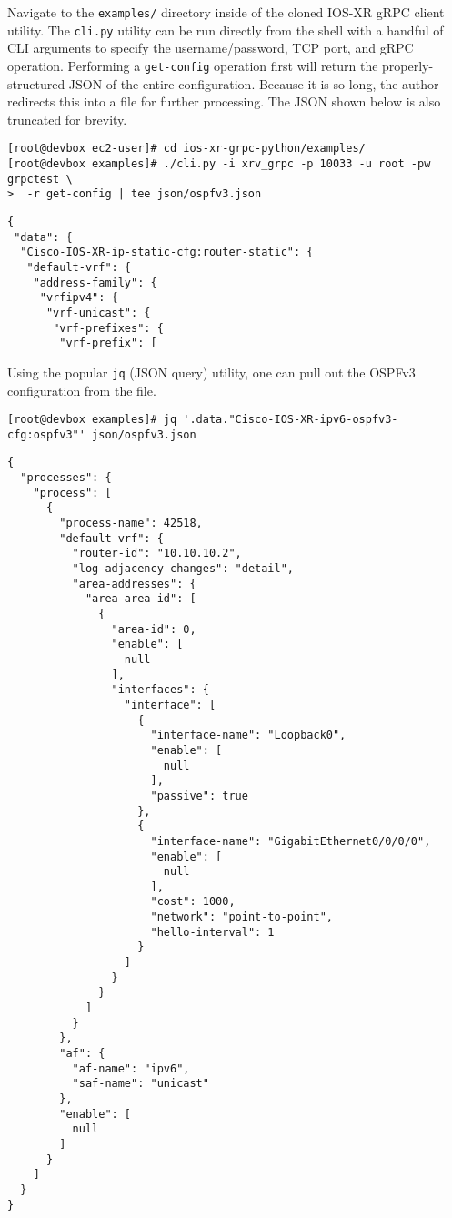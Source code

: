 Navigate to the \verb|examples/| directory inside of the cloned IOS-XR gRPC client
utility. The \verb|cli.py| utility can be run directly from the shell with a
handful of CLI arguments to specify the username/password, TCP port, and gRPC
operation. Performing a \verb|get-config| operation first will return the
properly-structured JSON of the entire configuration. Because it is so long,
the author redirects this into a file for further processing. The JSON shown
below is also truncated for brevity.

\begin{verbatim}
[root@devbox ec2-user]# cd ios-xr-grpc-python/examples/
[root@devbox examples]# ./cli.py -i xrv_grpc -p 10033 -u root -pw grpctest \
>  -r get-config | tee json/ospfv3.json
\end{verbatim}
\begin{verbatim}
{
 "data": {
  "Cisco-IOS-XR-ip-static-cfg:router-static": {
   "default-vrf": {
    "address-family": {
     "vrfipv4": {
      "vrf-unicast": {
       "vrf-prefixes": {
        "vrf-prefix": [
\end{verbatim}

Using the popular \verb|jq| (JSON query) utility, one can pull out the OSPFv3
configuration from the file.

\begin{verbatim}
[root@devbox examples]# jq '.data."Cisco-IOS-XR-ipv6-ospfv3-cfg:ospfv3"' json/ospfv3.json 
\end{verbatim}
\begin{verbatim}
{
  "processes": {
    "process": [
      {
        "process-name": 42518,
        "default-vrf": {
          "router-id": "10.10.10.2",
          "log-adjacency-changes": "detail",
          "area-addresses": {
            "area-area-id": [
              {
                "area-id": 0,
                "enable": [
                  null
                ],
                "interfaces": {
                  "interface": [
                    {
                      "interface-name": "Loopback0",
                      "enable": [
                        null
                      ],
                      "passive": true
                    },
                    {
                      "interface-name": "GigabitEthernet0/0/0/0",
                      "enable": [
                        null
                      ],
                      "cost": 1000,
                      "network": "point-to-point",
                      "hello-interval": 1
                    }
                  ]
                }
              }
            ]
          }
        },
        "af": {
          "af-name": "ipv6",
          "saf-name": "unicast"
        },
        "enable": [
          null
        ]
      }
    ]
  }
}
\end{verbatim}

